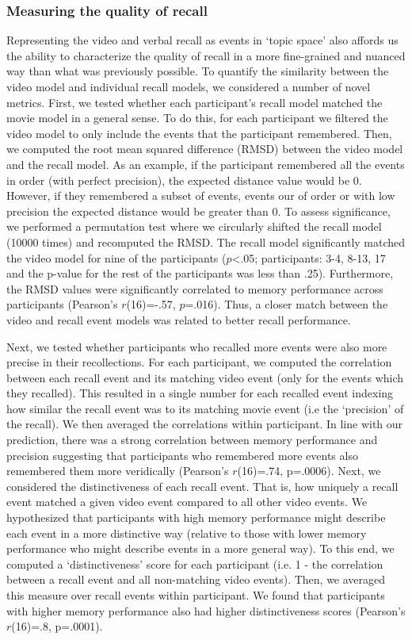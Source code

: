 \documentclass{article}
\begin{document}
{\subsubsection{Measuring the quality of recall}
Representing the video and verbal recall as events in `topic space' also affords us the ability to characterize the quality of recall in a more fine-grained and nuanced way than what was previously possible. To quantify the similarity between the video model and individual recall models, we considered a number of novel metrics.  First, we tested whether each participant's recall model matched the movie model in a general sense. To do this, for each participant we filtered the video model to only include the events that the participant remembered. Then, we computed the root mean squared difference (RMSD) between the video model and the recall model. As an example, if the participant remembered all the events in order (with perfect precision), the expected distance value would be 0. However, if they remembered a subset of events, events our of order or with low precision the expected distance would be greater than 0. To assess significance, we performed a permutation test where we circularly shifted the recall model (10000 times) and recomputed the RMSD. The recall model significantly matched the video model for nine of the participants ($p$<.05; participants: 3-4, 8-13, 17 and the p-value for the rest of the participants was less than .25). Furthermore, the RMSD values were significantly correlated to memory performance across participants (Pearson's $r$(16)=-.57, $p$=.016). Thus, a closer match between the video and recall event models was related to better recall performance.

Next, we tested whether participants who recalled more events were also more precise in their recollections. For each participant, we computed the correlation between each recall event and its matching video event (only for the events which they recalled). This resulted in a single number for each recalled event indexing how similar the recall event was to its matching movie event (i.e the `precision' of the recall). We then averaged the correlations within participant. In line with our prediction, there was a strong correlation between memory performance and precision suggesting that participants who remembered more events also remembered them more veridically (Pearson's $r$(16)=.74, p=.0006). Next, we considered the distinctiveness of each recall event. That is, how uniquely a recall event matched a given video event compared to all other video events. We hypothesized that participants with high memory performance might describe each event in a more distinctive way (relative to those with lower memory performance who might describe events in a more general way). To this end, we computed a `distinctiveness' score for each participant (i.e. 1 - the correlation between a recall event and all non-matching video events).  Then, we averaged this measure over recall events within participant.  We found that participants with higher memory performance also had higher distinctiveness scores (Pearson's $r$(16)=.8, p=.0001).

}
\end{document}

